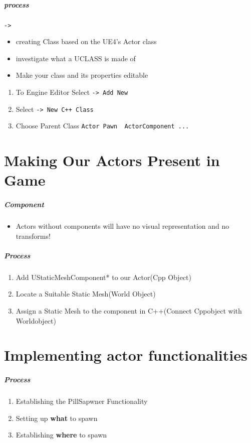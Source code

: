 \documentclass[UTF8,a4paper,12pt]{ctexbook}
\begin{document}
		\subparagraph{process}
			\verb|->|
			
				\begin{itemize}[itemindent = 2em ]
					\item creating Class based on the UE4's Actor class
					
					\item investigate what a UCLASS is made of
					
					\item Make your class and its properties editable
				\end{itemize}
			
			
			\begin{enumerate}[itemindent = 2em]
				\item To Engine Editor Select \verb|-> Add New|
				\item Select \verb|-> New C++ Class|
				\item Choose Parent Class \verb|Actor Pawn  ActorComponent ...|
			\end{enumerate}
	
	
	
	\section{Making Our Actors Present in Game}	
		\subparagraph{Component}
			\begin{itemize}[itemindent = 2em]
				\item Actors without components will have no visual representation and no transforms!
			\end{itemize}
	
		\subparagraph{Process}	
			\begin{enumerate}[itemindent = 2em]
				\item Add UStaticMeshComponent* to our Actor(Cpp Object)
				\item Locate a Suitable Static Mesh(World Object)
				\item Assign a Static Mesh to the component in C++(Connect Cppobject with Worldobject)
			\end{enumerate}

		
		
	\section{Implementing actor functionalities}
		\subparagraph{Process}
			\begin{enumerate}[itemindent = 2em]
				\item Establishing the PillSapwner Functionality
				\item Setting up \textbf{what} to spawn
				\item Establishing \textbf{where} to spawn
			\end{enumerate}
	
\end{document}
